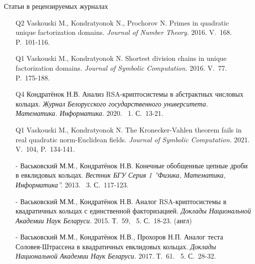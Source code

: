 \documentclass[8pt, xcolor=x11names]{beamer}
\begin{document}
\begin{frame}{Статьи в рецензируемых журналах}
    \begin{enumerate}
        \item[Q2] Vaskouski M., Kondratyonok N., Prochorov N. Primes in quadratic unique factorization domains. {\it Journal of Number Theory.} 2016. V.~168. P.~101-116.
        
        \item[Q1] Vaskouski M., Kondratyonok N. Shortest division chains in unique factorization domains. {\it Journal of Symbolic Computation.} 2016. V.~77. P.~175-188.
        
        \item[Q4] Кондратёнок Н.В. Анализ RSA-криптосистемы в абстрактных числовых кольцах. {\it Журнал Белорусского государственного университета. Математика. Информатика.} 2020. \textnumero~1. С.~13-21.

        \item[Q1] Vaskouski M., Kondratyonok N. The Kronecker-Vahlen theorem fails in real quadratic norm-Euclidean fields. {\it Journal of Symbolic Computation.} 2021. V.~104, P.~134-141.

        \item[-] Васьковский М.М., Кондратёнок Н.В. Конечные обобщенные цепные дроби в евклидовых кольцах. {\it Вестник БГУ Серия 1 ''Физика, Математика, Информатика''.} 2013. \textnumero~3. С.~117-123.
        
        \item[-] Васьковский М.М., Кондратёнок Н.В. Аналог RSA-криптосистемы в квадратичных кольцах с единственной факторизацией. {\it Доклады Национальной Академии Наук Беларуси.} 2015. Т.~59, \textnumero~5. С.~18-23. (англ)

        \item[-] Васьковский М.М., Кондратёнок Н.В., Прохоров Н.П. Аналог теста Соловея-Штрассена в квадратичных евклидовых кольцах. {\it Доклады Национальной Академии Наук Беларуси.} 2017. Т.~61. \textnumero~5. С.~28-32.
    \end{enumerate}
\end{frame}
\end{document}
